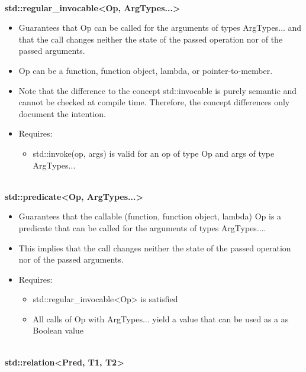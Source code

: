 \noindent
\hspace*{\fill} \\ %
\textbf{std::regular\_invocable<Op, ArgTypes...>}

\begin{itemize}
\item
Guarantees that Op can be called for the arguments of types ArgTypes... and that the call changes neither the state of the passed operation nor of the passed arguments.

\item
Op can be a function, function object, lambda, or pointer-to-member.

\item
Note that the difference to the concept std::invocable is purely semantic and cannot be checked at compile time. Therefore, the concept differences only document the intention.

\item
Requires:
\begin{itemize}
\item
std::invoke(op, args) is valid for an op of type Op and args of type ArgTypes...
\end{itemize}
\end{itemize}

\noindent
\hspace*{\fill} \\ %
\textbf{std::predicate<Op, ArgTypes...>}

\begin{itemize}
\item
Guarantees that the callable (function, function object, lambda) Op is a predicate that can be called for the arguments of types ArgTypes....

\item
This implies that the call changes neither the state of the passed operation nor of the passed arguments.

\item
Requires:
\begin{itemize}
\item
std::regular\_invocable<Op> is satisfied

\item
 All calls of Op with ArgTypes... yield a value that can be used as a as Boolean value
\end{itemize}
\end{itemize}

\noindent
\hspace*{\fill} \\ %
\textbf{std::relation<Pred, T1, T2>}


